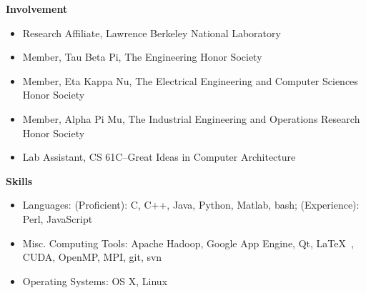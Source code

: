 \documentclass[letterpaper,11pt]{article}
\newcommand{\desitem}[1]{\item #1 \vspace{-7pt}}
\newcommand{\resheading}[1]{{\large \colorbox{mygrey}{\begin{minipage}{\textwidth}{\textbf{#1 \vphantom{p\^{E}}}}\end{minipage}}}}
\begin{document}
\resheading{Involvement}
\begin{itemize}
    \desitem{Research Affiliate,
    Lawrence Berkeley National Laboratory}
    \desitem{Member,
    Tau Beta Pi, The Engineering Honor Society}
     \desitem{Member,
    Eta Kappa Nu, The Electrical Engineering and Computer Sciences Honor Society}
    \desitem{Member,
    Alpha Pi Mu, The Industrial Engineering and Operations Research Honor Society}
   \desitem{Lab Assistant,
    CS 61C--Great Ideas in Computer Architecture}
\end{itemize}

\vspace{0.1in}

\resheading{Skills}
\begin{itemize}
    \desitem{Languages:
                    (Proficient): C, C++, Java, Python, Matlab, bash; (Experience): Perl, JavaScript}
    \desitem{Misc. Computing Tools:
                     Apache Hadoop, Google App Engine, Qt, \LaTeX\ , CUDA, OpenMP, MPI, git, svn}
    \desitem{Operating Systems:
                     OS X, Linux}
\end{itemize}
\end{document}
